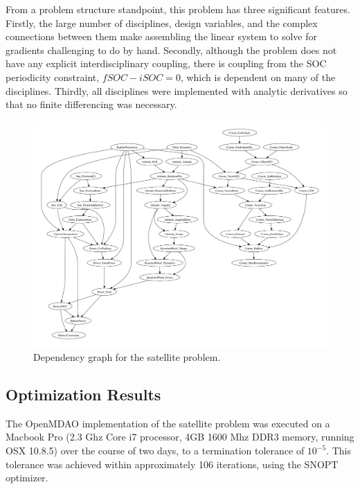 \documentclass[]{aiaa-tc} %
\begin{document}
    From a problem structure standpoint, this problem has three significant features. Firstly, the large number of
    disciplines, design variables, and the complex connections between them make assembling the linear system to solve for gradients
    challenging to do by hand. Secondly, although the problem does not have any explicit interdisciplinary coupling,
    there is coupling from the SOC periodicity constraint, $fSOC - iSOC = 0$, which is dependent on many of the
    disciplines. Thirdly, all disciplines were implemented with analytic derivatives so that no finite differencing was
    necessary.

    \begin{figure}[!htb]\begin{center}
      \includegraphics[width=1.1\textwidth]{images/CADRE.pdf}
      \caption{ Dependency graph for the satellite problem. \label{fig:cadre_graph}}
    \end{center}\end{figure}

    \subsection{Optimization Results}

        The OpenMDAO implementation of the satellite problem was executed on a
        Macbook Pro (2.3 Ghz Core i7 processor, 4GB 1600 Mhz DDR3 memory, running OSX 10.8.5)
        over the course of two days, to a termination tolerance of $10^{-5}$. This tolerance
        was achieved within approximately 106 iterations, using the SNOPT\cite{gill2005snopt}
        optimizer.
\end{document}
